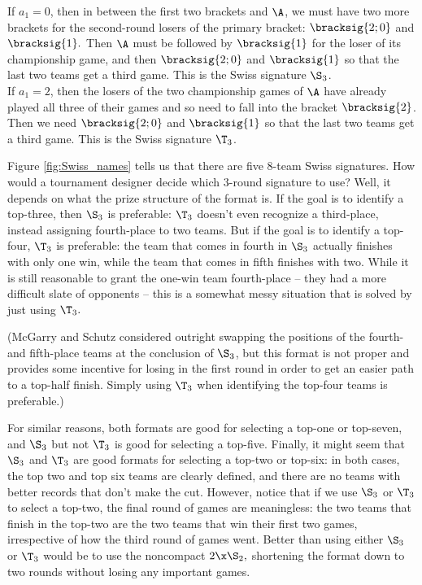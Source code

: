{{         If $a_1 = 0$, then in between the first two brackets and $\A$, we must have two more brackets for the second-round losers of the primary bracket: $\bracksig{2;0}$ and $\bracksig{1}.$ Then $\A$ must be followed by $\bracksig{1}$ for the loser of its championship game, and then $\bracksig{2;0}$ and $\bracksig{1}$ so that the last two teams get a third game. This is the Swiss signature $\S_3$.\\
        
         If $a_1 = 2$, then the losers of the two championship games of $\A$ have already played all three of their games and so need to fall into the bracket $\bracksig{2}$. Then we need $\bracksig{2;0}$ and $\bracksig{1}$ so that the last two teams get a third game. This is the Swiss signature $\T_3$.
        }{}{\fried}

    Figure \ref{fig:Swiss_names} tells us that there are five $8$-team Swiss signatures. How would a tournament designer decide which 3-round signature to use? Well, it depends on what the prize structure of the format is. If the goal is to identify a top-three, then  $\S_3$ is preferable: $\T_3$ doesn't even recognize a third-place, instead assigning fourth-place to two teams. But if the goal is to identify a top-four, $\T_3$ is preferable: the team that comes in fourth in $\S_3$ actually finishes with only one win, while the team that comes in fifth finishes with two. While it is still reasonable to grant the one-win team fourth-place -- they had a more difficult slate of opponents -- this is a somewhat messy situation that is solved by just using $\T_3.$

    (McGarry and Schutz \cite{four_five_swap} considered outright swapping the positions of the fourth- and fifth-place teams at the conclusion of $\S_3$, but this format is not proper and provides some incentive for losing in the first round in order to get an easier path to a top-half finish. Simply using $\T_3$ when identifying the top-four teams is preferable.)

    For similar reasons, both formats are good for selecting a top-one or top-seven, and $\S_3$ but not $\T_3$ is good for selecting a top-five. Finally, it might seem that $\S_3$ and $\T_3$ are good formats for selecting a top-two or top-six: in both cases, the top two and top six teams are clearly defined, and there are no teams with better records that don't make the cut. However, notice that if we use $\S_3$ or $\T_3$ to select a top-two, the final round of games are meaningless: the two teams that finish in the top-two are the two teams that win their first two games, irrespective of how the third round of games went. Better than using either $\S_3$ or $\T_3$ would be to use the noncompact $2\x\S_2,$ shortening the format down to two rounds without losing any important games.

}
